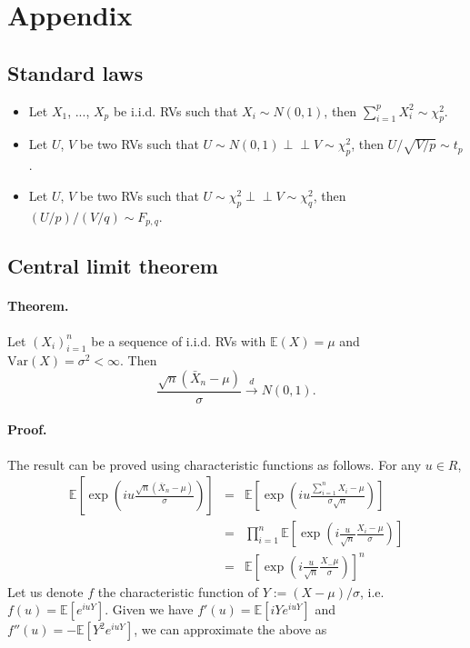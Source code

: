 \documentclass[]{article}
\begin{document}
\section{Appendix}

\subsection{Standard laws}

\begin{itemize}
\item Let $X_1$, ..., $X_p$ be i.i.d. RVs such that $X_i\sim N(0,1)$, then $\sum_{i=1}^p X_i^2 \sim \chi^2_p$.
\item Let $U$, $V$ be two RVs such that $U\sim N(0,1)\perp \!\!\! \perp V\sim \chi^2_p$, then $U/ \sqrt{V/p}\sim t_p$.
\item Let $U$, $V$ be two RVs such that $U\sim \chi^2_p\perp \!\!\! \perp V\sim \chi^2_q$, then $(U/p)/ (V/q)\sim F_{p,q}$.
\end{itemize}

\subsection{Central limit theorem}

\paragraph{Theorem.} Let $(X_i)_{i=1}^n$ be a sequence of i.i.d. RVs with $\mathbb{E}(X)=\mu$ and $\mathrm{Var}(X)=\sigma^2<\infty$. Then
\begin{equation}
\frac{\sqrt{n}(\bar{X}_n-\mu)}{\sigma}\xrightarrow{d}N(0,1).
\end{equation}

\paragraph{Proof.} The result can be proved using characteristic functions as follows. For any $u\in R$,
\begin{eqnarray}
\mathbb{E}\left[\exp\left(iu\frac{\sqrt{n}(\bar{X}_n-\mu)}{\sigma}\right)\right] &=& \mathbb{E}\left[\exp\left(iu\frac{\sum_{i=1}^n X_i-\mu}{\sigma\sqrt{n}}\right)\right] \\
&=& \prod_{i=1}^n \mathbb{E}\left[\exp\left(i\frac{u}{\sqrt{n}}\frac{X_i-\mu}{\sigma}\right)\right] \\
&=& \mathbb{E}\left[\exp\left(i\frac{u}{\sqrt{n}}\frac{X_-\mu}{\sigma}\right)\right]^n
\end{eqnarray}
Let us denote $f$ the characteristic function of $Y:=(X-\mu)/\sigma$, i.e. $f(u)=\mathbb{E}\left[e^{iuY}\right]$. Given we have $f'(u)=\mathbb{E}\left[iYe^{iuY}\right]$ and $f''(u)=-\mathbb{E}\left[Y^2e^{iuY}\right]$, we can approximate the above as
\end{document}
